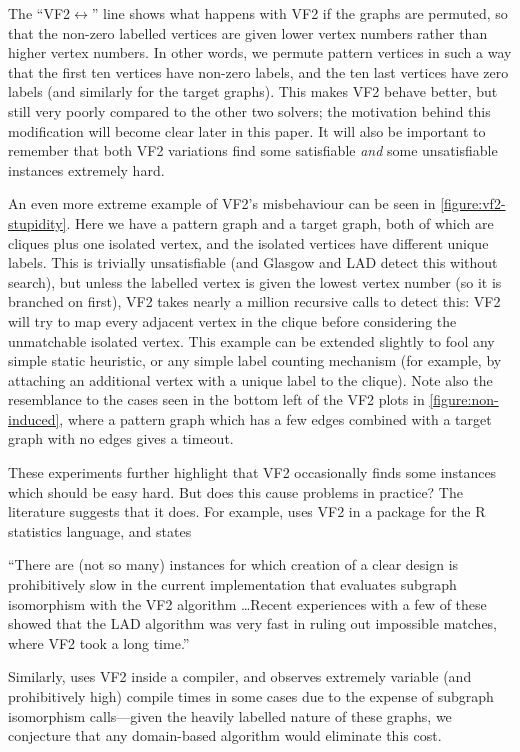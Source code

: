 \documentclass[twoside,11pt]{article}
\begin{document}
The ``VF2${\leftrightarrow}$'' line shows what happens with VF2 if the graphs are permuted, so that
the non-zero labelled vertices are given lower vertex numbers rather than higher vertex numbers.
In other words, we permute pattern vertices in such a way that the first ten vertices have non-zero
labels, and the ten last vertices have zero labels (and similarly for the target graphs).
This makes VF2 behave better, but still very poorly compared to the other two solvers; the
motivation behind this modification will become clear later in this paper.  It will also be
important to remember that both VF2 variations find some satisfiable \emph{and} some unsatisfiable
instances extremely hard.

An even more extreme example of VF2's misbehaviour can be seen in \cref{figure:vf2-stupidity}. Here
we have a pattern graph and a target graph, both of which are cliques plus one isolated vertex, and
the isolated vertices have different unique labels. This is trivially unsatisfiable (and Glasgow and
LAD detect this without search), but unless the labelled vertex is given the lowest vertex number
(so it is branched on first), VF2 takes nearly a million recursive calls to detect this: VF2 will
try to map every adjacent vertex in the clique before considering the unmatchable isolated vertex.
This example can be extended slightly to fool any simple static heuristic, or any simple label
counting mechanism (for example, by attaching an additional vertex with a unique label to the
clique). Note also the resemblance to the cases seen in the bottom left of the VF2 plots in
\cref{figure:non-induced}, where a pattern graph which has a few edges combined with a target graph
with no edges gives a timeout.

These experiments further highlight that VF2 occasionally finds some instances which should be easy hard.
But does this cause problems in practice? The literature suggests that it does. For example,
 uses VF2 in a package for the R statistics language, and states
\begin{displayquote}``There are (not so many) instances for which creation of a clear design is
    prohibitively slow in the current implementation that evaluates subgraph isomorphism with the
    VF2 algorithm \ldots Recent experiences with a few of these showed that the LAD algorithm was
    very fast in ruling out impossible matches, where VF2 took a long time.''\end{displayquote}
Similarly,  uses VF2 inside a compiler, and observes extremely variable
(and prohibitively high) compile times in some cases due to the expense of subgraph isomorphism
calls---given the heavily labelled nature of these graphs, we conjecture that any domain-based
algorithm would eliminate this cost.
\end{document}
